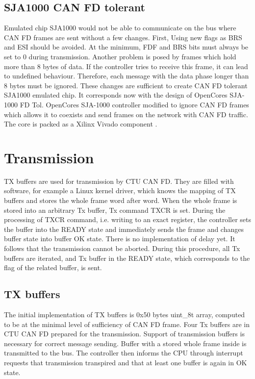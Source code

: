 \documentclass{ctuthesis}
\begin{document}
 \subsection{SJA1000 CAN FD tolerant}
 Emulated chip SJA1000 would not be able to communicate on the bus where CAN FD frames are sent without a few changes. First, Using new flags as BRS and ESI should be avoided. At the minimum, FDF and BRS bits must always be set to 0 during transmission. Another problem is posed by frames which hold more than 8 bytes of data. If the controller tries to receive this frame, it can lead to undefined behaviour. Therefore, each message with the data phase longer than 8 bytes must be ignored. These changes are sufficient to create CAN FD tolerant SJA1000 emulated chip. It corresponds now with the design of OpenCores SJA-1000 FD Tol. OpenCores SJA-1000 controller modified to ignore CAN FD frames which allows it to coexists and send frames on the network with CAN FD traffic. The core is packed as a Xilinx Vivado component \cite{sja1000-fdtol}.

 \section{Transmission}
  TX buffers are used for transmission by CTU CAN FD. They are filled with software, for example a Linux kernel driver, which knows the mapping of TX buffers and stores the whole frame word after word. When the whole frame is stored into an arbitrary Tx buffer, Tx command TXCR is set. During the processing of TXCR command, i.e. writing to an exact register, the controller sets the buffer into the READY state and immediately sends the frame and changes buffer state into buffer OK state. There is no implementation of delay yet. It follows that the transmission cannot be aborted. During this procedure, all Tx buffers are iterated, and Tx buffer in the READY state, which corresponds to the flag of the related buffer, is sent.

 \subsection{TX buffers}
  The initial implementation of TX buffers is 0x50 bytes uint\_8t array, computed to be at the minimal level of sufficiency of CAN FD frame. Four Tx buffers are in CTU CAN FD prepared for the transmission. Support of transmission buffers is necessary for correct message sending. Buffer with a stored whole frame inside is transmitted to the bus. The controller then informs the CPU through interrupt requests that transmission transpired and that at least one buffer is again in OK state.
\end{document}
